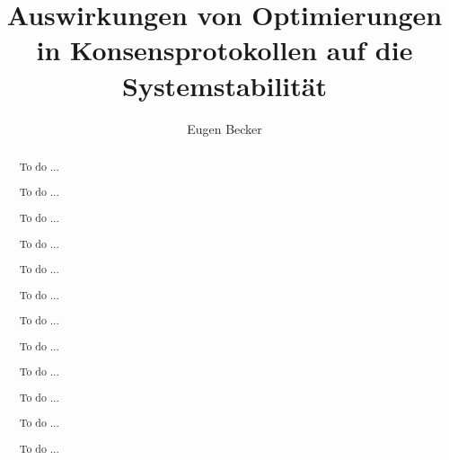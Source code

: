 \documentclass[nonacm,sigconf,natbib=false]{acmart}
\begin{document}
\title{Auswirkungen von Optimierungen in Konsensprotokollen auf die Systemstabilität} %

\author{Eugen Becker}

\renewcommand{\shortauthors}{Eugen Becker}

\renewcommand{\abstractname}{Kurzfassung}

\renewcommand{\refname}{Bibliographie}

\begin{abstract}
  To do ...

  To do ...

  To do ...

  To do ...

  To do ...

  To do ...

  To do ...

  To do ...

  To do ...

  To do ...

  To do ...

  To do ...
\end{abstract}


\maketitle
\end{document}

